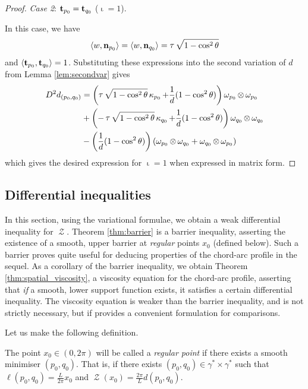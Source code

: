 \documentclass[11pt]{amsart}
\DeclareMathOperator{\chordarcprofile}{\mathcal{Z}}
\DeclareMathOperator{\tangindicator}{\iota}
\DeclareMathOperator{\norindicator}{\tau}
\begin{document}
\begin{proof}
\emph{Case 2}: $\operatorname{\mathbf{t}}_{p_0} = \operatorname{\mathbf{t}}_{q_0}$ ($\tangindicator = 1$).

In this case, we have 
\[
\ip{w}{\nor_{p_0}} = \ip{w}{\nor_{q_0}} = \norindicator \sqrt{1-\cos^2\theta}
\]
and $\langle{\operatorname{\mathbf{t}}_{p_0}},{\operatorname{\mathbf{t}}_{q_0}}\rangle = 1$. Substituting these expressions into the second variation of $d$  from Lemma \ref{lem:secondvar} gives
\begin{align*}
D^2d_{(p_0,q_0)} &=  \left(\norindicator \sqrt{1-\cos^2\theta}\curvecurv_{p_0} + \frac{1}{d}(1 - \cos^2\theta) \right) \omega_{p_0} \tensor \omega_{p_0} \\
&+ \left(-\norindicator \sqrt{1-\cos^2\theta} \curvecurv_{q_0} + \frac{1}{d}(1 - \cos^2\theta) \right) \omega_{q_0} \tensor \omega_{q_0} \\
&- \left(\frac{1}{d}(1 - \cos^2\theta) \right) \left(\omega_{p_0} \tensor \omega_{q_0} + \omega_{q_0} \tensor \omega_{p_0} \right)
\end{align*}
which gives the desired expression for $\tangindicator=1$ when expressed in matrix form.
\end{proof}

\subsection{Differential inequalities}
\label{sec:orgheadline9}

In this section, using the variational formulae, we obtain a weak differential inequality for \(\chordarcprofile\). Theorem \ref{thm:barrier} is a barrier inequality, asserting the existence of a smooth, upper barrier at \emph{regular} points \(x_0\) (defined below). Such a barrier proves quite useful for deducing properties of the chord-arc profile in the sequel. As a corollary of the barrier inequality, we obtain Theorem \ref{thm:spatial_viscosity}, a viscosity equation for the chord-arc profile, asserting that \emph{if} a smooth, lower support function exists, it satisfies a certain differential inequality. The viscosity equation is weaker than the barrier inequality, and is not strictly necessary, but if provides a convenient formulation for comparisons.

Let us make the following definition.
\begin{defn}
The point \(x_0 \in (0, 2\pi)\) will be called a \emph{regular point} if there exists a smooth minimiser \((p_0, q_0)\). That is, if there exists \((p_0, q_0) \in \gamma^{\ast} \times \gamma^{\ast}\) such that \(\ell(p_0, q_0) = \tfrac{L}{2\pi} x_0\) and \(\chordarcprofile(x_0) = \tfrac{2\pi}{L} d(p_0, q_0)\).
\end{defn}
\end{document}
